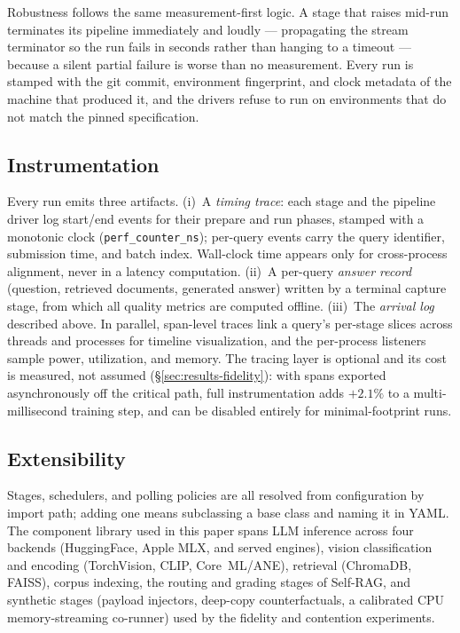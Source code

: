 Robustness follows the same measurement-first logic. A stage that raises
mid-run terminates its pipeline immediately and loudly --- propagating the
stream terminator so the run fails in seconds rather than hanging to a
timeout --- because a silent partial failure is worse than no measurement.
Every run is stamped with the git commit, environment fingerprint, and clock
metadata of the machine that produced it, and the drivers refuse to run on
environments that do not match the pinned specification.

\subsection{Instrumentation}
\label{sec:framework-instrumentation}

Every run emits three artifacts. (i)~A \emph{timing trace}: each stage and
the pipeline driver log start/end events for their prepare and run phases,
stamped with a monotonic clock (\texttt{perf\_counter\_ns}); per-query events
carry the query identifier, submission time, and batch index. Wall-clock
time appears only for cross-process alignment, never in a latency
computation. (ii)~A per-query \emph{answer record} (question, retrieved
documents, generated answer) written by a terminal capture stage, from which
all quality metrics are computed offline. (iii)~The \emph{arrival log}
described above. In parallel, span-level traces link a query's per-stage
slices across threads and processes for timeline visualization, and the
per-process listeners sample power, utilization, and memory. The tracing
layer is optional and its cost is measured, not assumed
(\S\ref{sec:results-fidelity}): with spans exported asynchronously off the
critical path, full instrumentation adds $+2.1\%$ to a multi-millisecond
training step, and can be disabled entirely for minimal-footprint runs.

\subsection{Extensibility}
Stages, schedulers, and polling policies are all resolved from configuration
by import path; adding one means subclassing a base class and naming it in
YAML. The component library used in this paper spans LLM inference across
four backends (HuggingFace, Apple MLX, and served engines), vision
classification and encoding (TorchVision, CLIP, Core~ML/ANE), retrieval
(ChromaDB, FAISS), corpus indexing, the routing and grading stages of
Self-RAG, and synthetic stages (payload injectors, deep-copy counterfactuals,
a calibrated CPU memory-streaming co-runner) used by the fidelity and
contention experiments.
